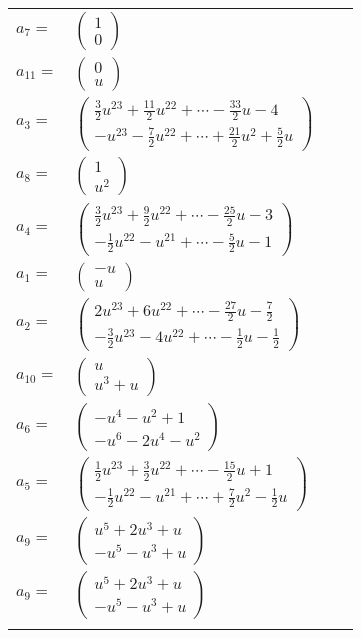 \documentclass[1p]{elsarticle_modified}
\theoremstyle{definition}
\begin{document}
\begin{tabular}{m{7pt} m{180pt} m{7pt} m{180pt} }
\flushright $a_{7}=$&$\begin{pmatrix}1\\0\end{pmatrix}$ \\
\flushright $a_{11}=$&$\begin{pmatrix}0\\u\end{pmatrix}$ \\
\flushright $a_{3}=$&$\begin{pmatrix}\frac{3}{2} u^{23}+\frac{11}{2} u^{22}+\cdots-\frac{33}{2} u-4\\- u^{23}-\frac{7}{2} u^{22}+\cdots+\frac{21}{2} u^2+\frac{5}{2} u\end{pmatrix}$ \\
\flushright $a_{8}=$&$\begin{pmatrix}1\\u^2\end{pmatrix}$ \\
\flushright $a_{4}=$&$\begin{pmatrix}\frac{3}{2} u^{23}+\frac{9}{2} u^{22}+\cdots-\frac{25}{2} u-3\\-\frac{1}{2} u^{22}- u^{21}+\cdots-\frac{5}{2} u-1\end{pmatrix}$ \\
\flushright $a_{1}=$&$\begin{pmatrix}- u\\u\end{pmatrix}$ \\
\flushright $a_{2}=$&$\begin{pmatrix}2 u^{23}+6 u^{22}+\cdots-\frac{27}{2} u-\frac{7}{2}\\-\frac{3}{2} u^{23}-4 u^{22}+\cdots-\frac{1}{2} u-\frac{1}{2}\end{pmatrix}$ \\
\flushright $a_{10}=$&$\begin{pmatrix}u\\u^3+u\end{pmatrix}$ \\
\flushright $a_{6}=$&$\begin{pmatrix}- u^4- u^2+1\\- u^6-2 u^4- u^2\end{pmatrix}$ \\
\flushright $a_{5}=$&$\begin{pmatrix}\frac{1}{2} u^{23}+\frac{3}{2} u^{22}+\cdots-\frac{15}{2} u+1\\-\frac{1}{2} u^{22}- u^{21}+\cdots+\frac{7}{2} u^2-\frac{1}{2} u\end{pmatrix}$ \\
\flushright $a_{9}=$&$\begin{pmatrix}u^5+2 u^3+u\\- u^5- u^3+u\end{pmatrix}$\\ \flushright $a_{9}=$&$\begin{pmatrix}u^5+2 u^3+u\\- u^5- u^3+u\end{pmatrix}$\\&\end{tabular}
\end{document}
